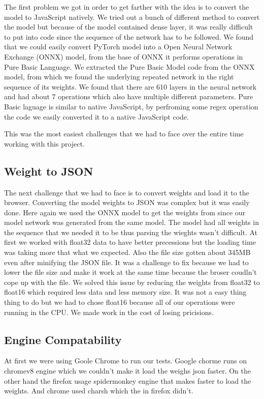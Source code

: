 \documentclass[a4paper,12pt]{article}
\begin{document}
The first problem we got in order to get farther with the idea is to convert the model to JavaScript natively. We tried out a bunch of different method to convert the model but because of the model contained dense layer, it was really difficult to put into code since the sequence of the network has to be followed. We found that we could easily convert PyTorch model into a  Open Neural Network Exchange (ONNX) model, from the base of ONNX it performs operations in Pure Basic Language. We extracted the Pure Basic Model code from the ONNX model, from which we found the underlying repeated network in the right sequence of its weights. We found that there are 610 layers in the neural network and had about 7 operations which also have multiple different parameters. Pure Basic laguage is similar to native JavaScript, by perfroming some regex operation the code we easily converted it to a native JavaScript code. 

This was the most easiest challenges that we had to face over the entire time working with this project.

\subsection{Weight to JSON}
The next challenge that we had to face is to convert weights and load it to the browser. Converting the model weights to JSON was complex but it was easily done. Here again we used the ONNX model to get the weights from since our model network was generated from the same model. The model had all weights in the sequence that we needed it to be thus parsing the wieghts wasn't difficult. At first we worked with float32 data to have better precessions but the loading time was taking more that what we expected. Also the file size gotten about 345MB even after minifying the JSON file. It was a challenge to fix because we had to lower the file size and make it work at the same time because the broser coudln't cope up with the file. We solved this issue by reducing the weights from float32 to float16 which required less data and less memory size. It was not a easy thing thing to do but we had to chose float16 because all of our operations were running in the CPU. We made work in the cost of losing pricisions.

\subsection{Engine Compatability}
At first we were using Goole Chrome to run our tests. Google chorme runs on chromev8 engine which we couldn't make it load the weighs json faster. On the other hand the firefox usage spidermonkey engine that makes faster to load the weights. And chrome used charsh which the in firefox didn't.
\end{document}
